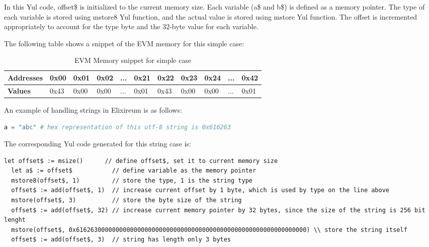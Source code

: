 In this Yul code, offset\$ is initialized to the current memory size. Each variable (a\$ and b\$) is defined as a memory pointer. The type of each variable is stored using mstore8 Yul function, and the actual value is stored using mstore Yul function. The offset is incremented appropriately to account for the type byte and the 32-byte value for each variable.

The following table shows a snippet of the EVM memory for this simple case:

\begin{table}[h!]
  \centering
  \renewcommand{\arraystretch}{1.2} %
  \begin{tabular}{|>{\centering\arraybackslash}m{2cm}|>{\centering\arraybackslash}m{1cm}|>{\centering\arraybackslash}m{1cm}|>{\centering\arraybackslash}m{1cm}|>{\centering\arraybackslash}m{0.75cm}|>{\centering\arraybackslash}m{1cm}|>{\centering\arraybackslash}m{1cm}|>{\centering\arraybackslash}m{1cm}|>{\centering\arraybackslash}m{1cm}|>{\centering\arraybackslash}m{0.75cm}|>{\centering\arraybackslash}m{1cm}|}
  \hline
  \textbf{Addresses} & 0x00 & 0x01 & 0x02 & ... & 0x21 & 0x22 & 0x23 & 0x24 & ... & 0x42 \\ \hline
  \textbf{Values}    & 0x43 & 0x00 & 0x00 & ... & 0x01 & 0x43 & 0x00 & 0x00 & ... & 0x01 \\ \hline
  \end{tabular}
  \caption{EVM Memory snippet for simple case}
  \label{tab:evm_memory}
  \end{table}

An example of handling strings in Elixireum is as follows:

\begin{lstlisting}[caption={Elixireum code for string case}, language=elixir]
  a = "abc" # hex representation of this utf-8 string is 0x616263
\end{lstlisting}
  
The corresponding Yul code generated for this string case is:

\begin{lstlisting}[caption={Generated yul code for string case}, language=yul]
  let offset$ := msize()      // define offset$, set it to current memory size 
  let a$ := offset$           // define variable as the memory pointer
  mstore8(offset$, 1)         // store the type, 1 is the string type
  offset$ := add(offset$, 1)  // increase current offset by 1 byte, which is used by type on the line above
  mstore(offset$, 3)          // store the byte size of the string
  offset$ := add(offset$, 32) // increase current memory pointer by 32 bytes, since the size of the string is 256 bit lenght
  mstore(offset$, 0x6162630000000000000000000000000000000000000000000000000000000000) \\ store the string itself
  offset$ := add(offset$, 3)  // string has length only 3 bytes
\end{lstlisting}

